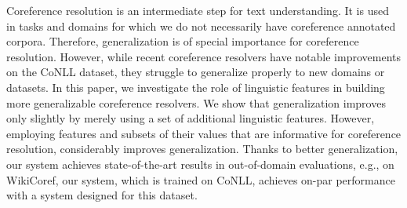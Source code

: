Coreference resolution is an intermediate step for text understanding. It is used in tasks and domains for which we do not necessarily have coreference annotated corpora. Therefore, generalization is of special importance for coreference resolution. However, while recent coreference resolvers have notable improvements on the CoNLL dataset, they struggle to generalize properly to new domains or datasets. In this paper, we investigate the role of linguistic features in building more generalizable coreference resolvers. We show that generalization improves only slightly by merely using a set of additional linguistic features. However, employing features and subsets of their values that are informative for coreference resolution, considerably improves generalization. Thanks to better generalization, our system achieves state-of-the-art results in out-of-domain evaluations, e.g., on WikiCoref,  our system, which is trained on CoNLL, achieves on-par performance with a system designed for this dataset.
